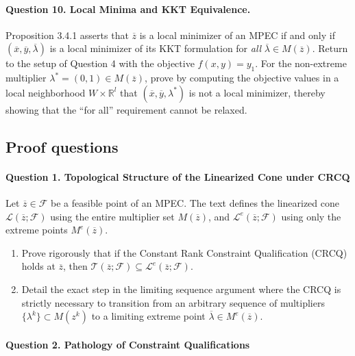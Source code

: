 \documentclass[pdflatex,sn-mathphys-num]{sn-jnl}%
\theoremstyle{definition}
\begin{document}
    \paragraph{Question 10. Local Minima and KKT Equivalence.} Proposition 3.4.1 asserts that $\overline{z}$ is a local minimizer of an MPEC if and only if $(\overline{x},\overline{y},\overline{\lambda})$ is a local minimizer of its KKT formulation for \textit{all} $\overline{\lambda} \in M(\overline{z})$. 
    Return to the setup of Question 4 with the objective $f(x,y) = y_1$. For the non-extreme multiplier $\lambda^* = (0,1) \in M(\overline{z})$, prove by computing the objective values in a local neighborhood $W \times \mathbb{R}^l$ that $(\overline{x}, \overline{y}, \lambda^*)$ is not a local minimizer, thereby showing that the ``for all'' requirement cannot be relaxed.


\subsection{Proof questions}

\paragraph{Question 1. Topological Structure of the Linearized Cone under CRCQ} 
    Let $\overline{z} \in \mathcal{F}$ be a feasible point of an MPEC. The text defines the linearized cone $\mathcal{L}(\overline{z}; \mathcal{F})$ using the entire multiplier set $M(\overline{z})$, and $\mathcal{L}^e(\overline{z}; \mathcal{F})$ using only the extreme points $M^e(\overline{z})$. 
    \begin{enumerate}
        \item Prove rigorously that if the Constant Rank Constraint Qualification (CRCQ) holds at $\overline{z}$, then $\mathcal{T}(\overline{z}; \mathcal{F}) \subseteq \mathcal{L}^e(\overline{z}; \mathcal{F})$. 
        \item Detail the exact step in the limiting sequence argument where the CRCQ is strictly necessary to transition from an arbitrary sequence of multipliers $\{\lambda^k\} \subset M(z^k)$ to a limiting extreme point $\overline{\lambda} \in M^e(\overline{z})$.
    \end{enumerate}

    \paragraph{Question 2. Pathology of Constraint Qualifications}
    
\end{document}
